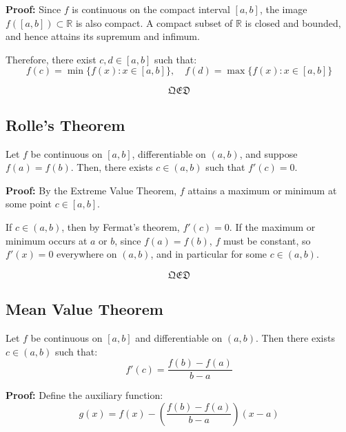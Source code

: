 \textbf{Proof:}  
Since \( f \) is continuous on the compact interval \([a, b]\), the image \( f([a, b]) \subset \mathbb{R} \) is also compact. A compact subset of \( \mathbb{R} \) is closed and bounded, and hence attains its supremum and infimum.

Therefore, there exist \( c, d \in [a, b] \) such that:
\[
f(c) = \min\{f(x): x \in [a, b]\}, \quad
f(d) = \max\{f(x): x \in [a, b]\}
\]

\[\mathfrak{QED}\]


\subsection{Rolle’s Theorem}

Let \( f \) be continuous on \([a, b] \), differentiable on \((a, b) \), and suppose \( f(a) = f(b) \).  
Then, there exists \( c \in (a, b) \) such that \( f'(c) = 0 \).

\textbf{Proof:}  
By the Extreme Value Theorem, \( f \) attains a maximum or minimum at some point \( c \in [a, b] \).

If \( c \in (a, b) \), then by Fermat’s theorem, \( f'(c) = 0 \).  
If the maximum or minimum occurs at \( a \) or \( b \), since \( f(a) = f(b) \), \( f \) must be constant, so \( f'(x) = 0 \) everywhere on \((a, b)\), and in particular for some \( c \in (a, b) \).

\[\mathfrak{QED}\]

\begin{center}
\end{center}



\subsection{Mean Value Theorem}

Let \( f \) be continuous on \([a, b] \) and differentiable on \((a, b) \).  
Then there exists \( c \in (a, b) \) such that:
\[
f'(c) = \frac{f(b) - f(a)}{b - a}
\]

\textbf{Proof:}  
Define the auxiliary function:
\[
g(x) = f(x) - \left( \frac{f(b) - f(a)}{b - a} \right)(x - a)
\]


